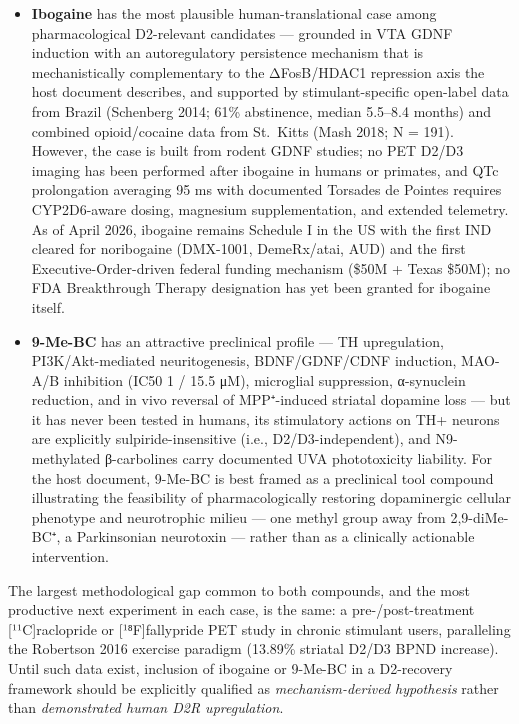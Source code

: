 \begin{itemize}
\tightlist
\item
  \textbf{Ibogaine} has the most plausible human-translational case among pharmacological D2-relevant candidates --- grounded in VTA GDNF induction with an autoregulatory persistence mechanism that is mechanistically complementary to the ΔFosB/HDAC1 repression axis the host document describes, and supported by stimulant-specific open-label data from Brazil (Schenberg 2014; 61\% abstinence, median 5.5--8.4 months) and combined opioid/cocaine data from St.~Kitts (Mash 2018; N = 191). However, the case is built from rodent GDNF studies; no PET D2/D3 imaging has been performed after ibogaine in humans or primates, and QTc prolongation averaging 95 ms with documented Torsades de Pointes requires CYP2D6-aware dosing, magnesium supplementation, and extended telemetry. As of April 2026, ibogaine remains Schedule I in the US with the first IND cleared for noribogaine (DMX-1001, DemeRx/atai, AUD) and the first Executive-Order-driven federal funding mechanism (\$50M + Texas \$50M); no FDA Breakthrough Therapy designation has yet been granted for ibogaine itself.
\item
  \textbf{9-Me-BC} has an attractive preclinical profile --- TH upregulation, PI3K/Akt-mediated neuritogenesis, BDNF/GDNF/CDNF induction, MAO-A/B inhibition (IC50 1 / 15.5 μM), microglial suppression, α-synuclein reduction, and in vivo reversal of MPP⁺-induced striatal dopamine loss --- but it has never been tested in humans, its stimulatory actions on TH+ neurons are explicitly sulpiride-insensitive (i.e., D2/D3-independent), and N9-methylated β-carbolines carry documented UVA phototoxicity liability. For the host document, 9-Me-BC is best framed as a preclinical tool compound illustrating the feasibility of pharmacologically restoring dopaminergic cellular phenotype and neurotrophic milieu --- one methyl group away from 2,9-diMe-BC⁺, a Parkinsonian neurotoxin --- rather than as a clinically actionable intervention.
\end{itemize}

The largest methodological gap common to both compounds, and the most productive next experiment in each case, is the same: a pre-/post-treatment {[}¹¹C{]}raclopride or {[}¹⁸F{]}fallypride PET study in chronic stimulant users, paralleling the Robertson 2016 exercise paradigm (13.89\% striatal D2/D3 BPND increase). Until such data exist, inclusion of ibogaine or 9-Me-BC in a D2-recovery framework should be explicitly qualified as \emph{mechanism-derived hypothesis} rather than \emph{demonstrated human D2R upregulation}.
